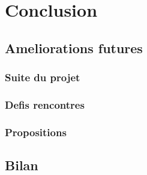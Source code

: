 \chapter{Conclusion}
        \section{Ameliorations futures}
        \subsection{Suite du projet}
        \lipsum[1]
         \subsection{Defis rencontres}
        \lipsum[1]
         \subsection{Propositions}
        \lipsum[1]
        \section{Bilan}
                     
